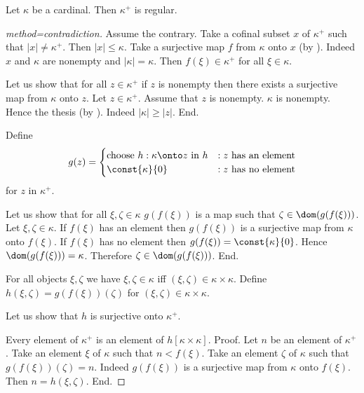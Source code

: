 \documentclass{article}
\begin{document}
  \begin{forthel}
    \begin{theorem*}[title=Hausdorff]
      Let $\kappa$ be a cardinal.
      Then $\kappa^+$ is regular.
    \end{theorem*}
    \begin{proof}[method=contradiction]
      Assume the contrary.
      Take a cofinal subset $x$ of $\kappa^+$ such that $|x| \neq \kappa^+$.
      Then $|x| \leq \kappa$.
      Take a surjective map $f$ from $\kappa$ onto $x$ (by ).
      Indeed $x$ and $\kappa$ are nonempty and $|\kappa| = \kappa$.
      Then $f(\xi) \in \kappa^+$ for all $\xi \in \kappa$.

      Let us show that for all $z \in \kappa^+$ if $z$ is nonempty then there exists a surjective map from $\kappa$ onto $z$.
        Let $z \in \kappa^+$.
        Assume that $z$ is nonempty.
        $\kappa$ is nonempty.
        Hence the thesis (by ).
        Indeed $|\kappa| \geq |z|$.
      End.

      Define \[ g(z) =
        \begin{cases}
          \text{choose $h : \kappa \onto z$ in $h$}
          & : \text{$z$ has an element}
          \\
          \text{$\const{\kappa}{0}$}
          & : \text{$z$ has no element}
        \end{cases}
      \] for $z$ in $\kappa^+$.

      Let us show that for all $\xi, \zeta \in \kappa$ $g(f(\xi))$ is a map such that $\zeta \in \dom(g(f(\xi)))$.
        Let $\xi, \zeta \in \kappa$.
        If $f(\xi)$ has an element then $g(f(\xi))$ is a surjective map from $\kappa$ onto $f(\xi)$.
        If $f(\xi)$ has no element then $g(f(\xi)) = \const{\kappa}{0}$.
        Hence $\dom(g(f(\xi))) = \kappa$.
        Therefore $\zeta \in \dom(g(f(\xi)))$.
      End.

      For all objects $\xi, \zeta$ we have $\xi, \zeta \in \kappa$ iff $(\xi, \zeta) \in \kappa \times \kappa$.
      Define $h(\xi,\zeta) = g(f(\xi))(\zeta)$ for $(\xi,\zeta) \in \kappa \times \kappa$.

      Let us show that $h$ is surjective onto $\kappa^+$.

        Every element of $\kappa^+$ is an element of $h[\kappa \times \kappa]$. \newline
        Proof.
          Let $n$ be an element of $\kappa^+$.
          Take an element $\xi$ of $\kappa$ such that $n < f(\xi)$.
          Take an element $\zeta$ of $\kappa$ such that $g(f(\xi))(\zeta) = n$.
          Indeed $g(f(\xi))$ is a surjective map from $\kappa$ onto $f(\xi)$.
          Then $n = h(\xi,\zeta)$.
        End.


\end{proof}
\end{forthel}
\end{document}
